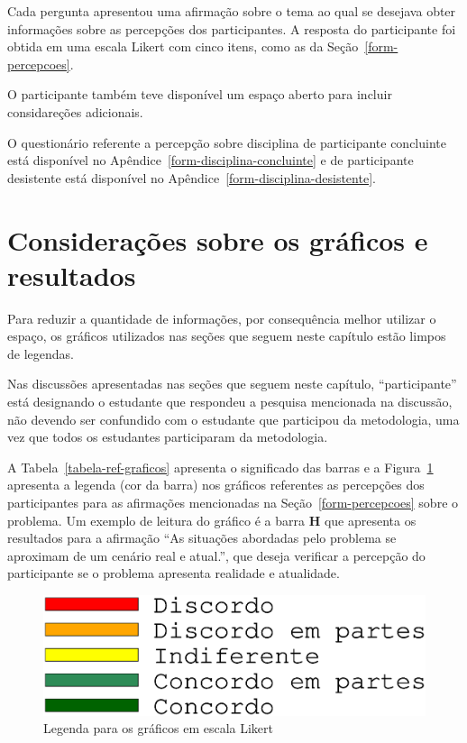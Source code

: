 Cada pergunta apresentou uma afirmação sobre o tema ao qual se desejava obter informações sobre as
percepções dos participantes.
A resposta do participante foi obtida em uma escala Likert com cinco itens, como as da Seção~\ref{form-percepcoes}.

O participante também teve disponível um espaço aberto para incluir considareções adicionais.

O questionário referente a percepção sobre disciplina de participante
concluinte está disponível no Apêndice~\ref{form-disciplina-concluinte}
e de participante desistente está disponível no
Apêndice~\ref{form-disciplina-desistente}.

\section{Considerações sobre os gráficos e resultados}
\label{sec-ref-graficos}
Para reduzir a quantidade de informações, por consequência melhor utilizar o
espaço, os gráficos utilizados nas seções que seguem neste capítulo
estão limpos de legendas.

Nas discussões apresentadas nas seções que seguem neste capítulo,
``participante'' está designando o estudante que respondeu a
pesquisa mencionada na discussão, não devendo ser confundido com
o estudante que participou da metodologia, uma vez que todos
os estudantes participaram da metodologia.

A Tabela~\ref{tabela-ref-graficos} apresenta o significado das barras
e a Figura~\ref{figura-ref-graficos} apresenta a legenda (cor da barra)
nos gráficos referentes as percepções dos participantes para as
afirmações mencionadas na Seção~\ref{form-percepcoes} sobre
o problema.
Um exemplo de leitura do gráfico é a barra \textbf{H} que apresenta
os resultados para a afirmação ``As situações abordadas pelo problema
se aproximam de um cenário real e atual.'', que deseja verificar
a percepção do participante se o problema apresenta realidade
e atualidade.

\begin{figure}[!htb]
\centering
\includegraphics[scale=0.3,trim={0 4cm 0 1.5cm},clip]{figura-ref-graficos.eps}
\caption{Legenda para os gráficos em escala Likert} 
\label{figura-ref-graficos}
\end{figure}

